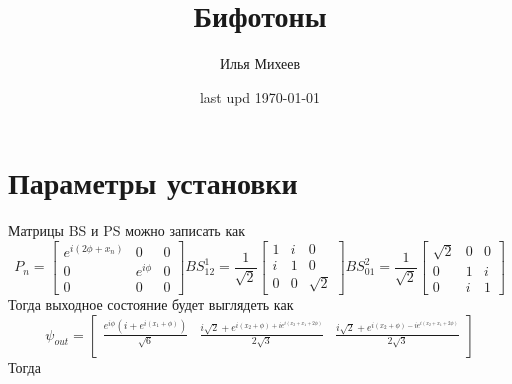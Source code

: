 \documentclass[a4paper,12pt]{article} %
\author{Илья Михеев}
\title{Бифотоны}
\date{last upd \today  }
\theoremstyle{definition}
\begin{document}
	
	\maketitle 
	\section{Параметры установки}
	Матрицы BS и PS можно записать как 
	\begin{equation*}
		P_n = \begin{bmatrix}
			e^{i(2\phi + x_n)}&0  & 0\\ 
			0& e^{i \phi} & 0\\ 
			0& 0 & 0
		\end{bmatrix}
		BS^1_{12} = \frac{1}{\sqrt{2}}\begin{bmatrix}
			1&i  & 0\\ 
			i&  1& 0\\ 
			0& 0 & \sqrt{2}
		\end{bmatrix}
		BS^2_{01} = \frac{1}{\sqrt{2}} \begin{bmatrix}
			\sqrt{2}&0  &0 \\ 
			0& 1 &i \\ 
			0& i & 1
		\end{bmatrix}
	\end{equation*}
	Тогда выходное состояние будет выглядеть как
	\begin{equation*}
		\psi_{out} = \begin{bmatrix}
			\frac{e^{i \phi}(i + e^{i(x_1 + \phi)})}{\sqrt{6}}&\frac{i \sqrt{2} + e^{i(x_2 + \phi) + i e^{i(x_2+x_1+2\phi)}}}{2 \sqrt{3}}&\frac{i \sqrt{2} + e^{i(x_2 + \phi) - i e^{i(x_2+x_1+2\phi)}}}{2 \sqrt{3}} \\ 
		\end{bmatrix}
	\end{equation*}
	Тогда 
\end{document}
